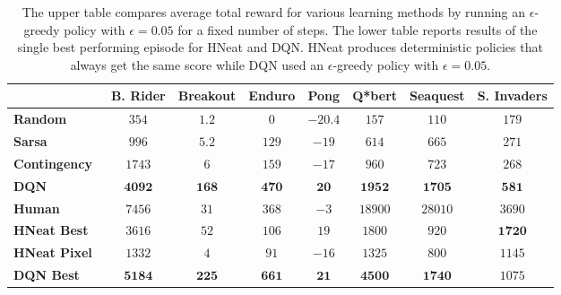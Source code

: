 \begin{table}
\begin{center}
\begin{tabular}{ |l | c | c | c | c | c | c | c |}
	\hline
	& {\small \textbf{B. Rider}} & {\small \textbf{Breakout}} & {\small \textbf{Enduro}} & {\small \textbf{Pong}} & {\small \textbf{Q*bert}} & {\small \textbf{Seaquest}} & {\small \textbf{S. Invaders}}\\
	\hline
	{\small \textbf{Random}}                                    & $354$ & $1.2$ & $0$ & $-20.4$ & $157$ & $110$ & $179$ \\
	\hline
	{\small \textbf{Sarsa}~\cite{bellemare-ale}}                & $996$ & $5.2$ & $129$ & $-19$ & $614$ & $665$ & $271$ \\
	\hline
	{\small \textbf{Contingency}~\cite{bellemare-contingency} } & $1743$ & $6$ & $159$ & $-17$ & $960$ & $723$ & $268$ \\
	\hline
	{\small \textbf{DQN} }                                      & $\textbf{4092}$ & $\textbf{168}$ & $\textbf{470}$ & $\textbf{20}$ & $\textbf{1952}$ & $\textbf{1705}$ & $\textbf{581}$ \\
	\hline
	{\small \textbf{Human} }                                    & $7456$ & $31$ & $368$ & $-3$ & $18900$ & $28010$ & $3690$ \\
	\hline
	\hline
	{\small \textbf{HNeat Best} \cite{hausknecht-neuro}}        & $3616$ & $52$ & $106$ & $19$ & $1800$ & $920$ & $\textbf{1720}$ \\
	\hline
	{\small \textbf{HNeat Pixel} \cite{hausknecht-neuro}}       & $1332$ & $4$ & $91$ & $-16$ & $1325$ & $800$ & $1145$ \\
	\hline
	{\small \textbf{DQN Best}}                                  & $\textbf{5184}$ & $\textbf{225}$ & $\textbf{661}$ & $\textbf{21}$ & $\textbf{4500}$ & $\textbf{1740}$ & $1075$ \\
	\hline
\end{tabular}
\caption{\label{table-results} The upper table compares average total reward for various learning methods by running an $\epsilon$-greedy policy with $\epsilon=0.05$ for a fixed number of steps. The lower table reports results of the single best performing episode for HNeat and DQN.  HNeat produces deterministic policies that always get the same score while DQN used an $\epsilon$-greedy policy with $\epsilon=0.05$.}
\end{center}
\end{table}

